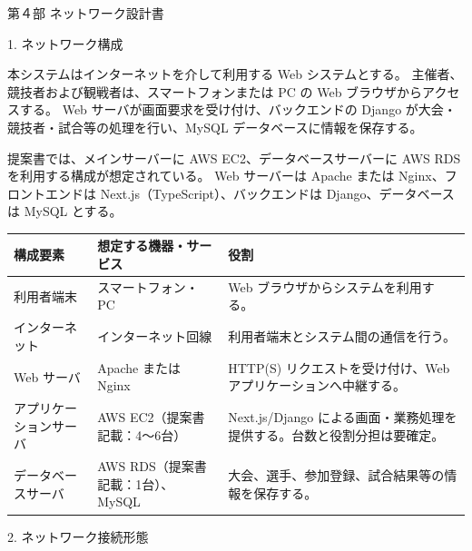 \documentclass[a4paper,10pt]{ltjsarticle}
\begin{document}
{\Large\color{headingblue}
第４部 ネットワーク設計書
}

\vspace{12pt}

{\large\color{headingblue}
1. ネットワーク構成
}

本システムはインターネットを介して利用する Web システムとする。
主催者、競技者および観戦者は、スマートフォンまたは PC の Web ブラウザからアクセスする。
Web サーバが画面要求を受け付け、バックエンドの Django が大会・競技者・試合等の処理を行い、MySQL データベースに情報を保存する。

提案書では、メインサーバーに AWS EC2、データベースサーバーに AWS RDS を利用する構成が想定されている。
Web サーバーは Apache または Nginx、フロントエンドは Next.js（TypeScript）、バックエンドは Django、データベースは MySQL とする。

\begin{tabularx}{\textwidth}{|
>{\raggedright\arraybackslash}p{}|
Y|
Y|}
\hline
{}
\textbf{構成要素} &
\textbf{想定する機器・サービス} &
\textbf{役割} \\
\hline

利用者端末 &
スマートフォン・PC &
Web ブラウザからシステムを利用する。 \\
\hline

インターネット &
インターネット回線 &
利用者端末とシステム間の通信を行う。 \\
\hline

Web サーバ &
Apache または Nginx &
HTTP(S) リクエストを受け付け、Web アプリケーションへ中継する。 \\
\hline

アプリケーションサーバ &
AWS EC2（提案書記載：4～6台） &
Next.js/Django による画面・業務処理を提供する。台数と役割分担は要確定。 \\
\hline

データベースサーバ &
AWS RDS（提案書記載：1台）、MySQL &
大会、選手、参加登録、試合結果等の情報を保存する。 \\
\hline
\end{tabularx}

\vspace{25pt}

{\large\color{headingblue}
2. ネットワーク接続形態
}
\end{document}
